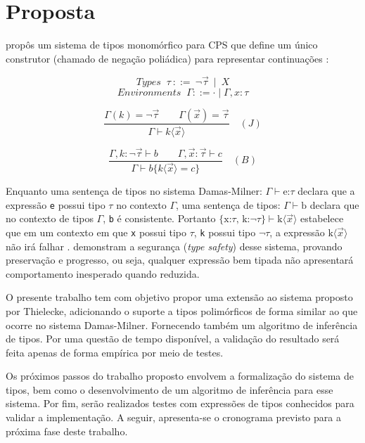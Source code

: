 \chapter{Proposta}\label{ch:proposta}

 propôs um sistema de tipos monomórfico para CPS que define um único construtor (chamado de negação poliádica) para representar continuações \cite{TORRENS2024}:


\[
    \textit{Types } \ \tau \ ::= \ \neg \vec{\tau} \ \mid \ X
\]
\[
    \textit{Environments } \ \Gamma ::= \cdot \mid \Gamma, x : \tau
\]

\[
\frac{
  \Gamma(k) = \neg \vec{\tau} 
  \quad \quad
  \Gamma(\vec{x}) = \vec{\tau}
}{
  \Gamma \vdash k\langle \vec{x} \rangle
} \quad (J)
\]

\[
\frac{
  \Gamma, k : \neg \vec{\tau} \vdash b
  \quad \quad
  \Gamma, \vec{x} : \vec{\tau} \vdash c
}{
  \Gamma \vdash b \{ k \langle \vec{x} \rangle = c \}
} \quad (B)
\]

Enquanto uma sentença de tipos no sistema Damas-Milner: $\Gamma \vdash \text{e:}\tau$ declara que a expressão \texttt{e} possui tipo $\tau$ no contexto $\Gamma$, uma sentença de tipos: $\Gamma \vdash \text{b}$ declara que no contexto de tipos $\Gamma$, \texttt{b} é consistente.
Portanto $\{\text{x:}\tau \text{, k:} \neg \tau\} \vdash \text{k}\langle \vec{x} \rangle$ estabelece que em um contexto em que \texttt{x} possui tipo $\tau$, \texttt{k} possui tipo $\neg \tau$, a expressão $\text{k}\langle \vec{x} \rangle$ não irá falhar \cite{thielecke1997}.
 demonstram a segurança (\textit{type safety}) desse sistema, provando preservação e progresso, ou seja, qualquer expressão bem tipada não apresentará comportamento inesperado quando reduzida.

O presente trabalho tem com objetivo propor uma extensão ao sistema proposto por Thielecke, adicionando o suporte a tipos polimórficos de forma similar ao que ocorre no sistema Damas-Milner.
Fornecendo também um algoritmo de inferência de tipos.
Por uma questão de tempo disponível, a validação do resultado será feita apenas de forma empírica por meio de testes.

Os próximos passos do trabalho proposto envolvem a formalização do sistema de tipos, bem como o desenvolvimento de um algoritmo de inferência para esse sistema.
Por fim, serão realizados testes com expressões de tipos conhecidos para validar a implementação.
A seguir, apresenta-se o cronograma previsto para a próxima fase deste trabalho.

